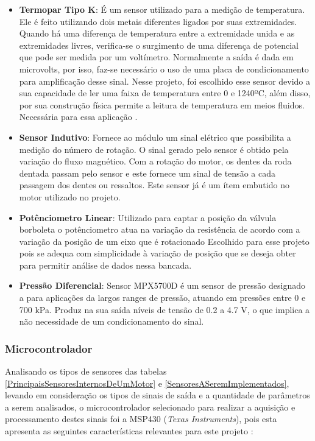 \begin{itemize}	
	\item \textbf{Termopar Tipo K}: É um sensor utilizado para a medição de temperatura. Ele é feito utilizando dois metais diferentes ligados por suas extremidades. Quando há uma diferença de temperatura entre a extremidade unida e as extremidades livres, verifica-se o surgimento de uma diferença de potencial que pode ser medida por um voltímetro. Normalmente a saída é dada em microvolts, por isso, faz-se necessário o uso de uma placa de condicionamento para amplificação desse sinal. Nesse projeto, foi escolhido esse sensor devido a sua capacidade de ler uma faixa de temperatura entre 0 e 1240$º$C, além disso, por sua construção física permite a leitura de temperatura em meios fluidos. Necessária para essa aplicação \cite{vdo01}.
	
	\item \textbf{Sensor Indutivo}: Fornece ao módulo um sinal elétrico que possibilita a medição do número de rotação. O sinal gerado pelo sensor é obtido pela variação do fluxo magnético. Com a rotação do motor, os dentes da roda dentada passam pelo sensor e este fornece um sinal de tensão a cada passagem dos dentes ou ressaltos. Este sensor já é um ítem embutido no motor utilizado no projeto\cite{vdo01}.
	
	\item \textbf{Potênciometro Linear}:
	Utilizado para captar a posição da válvula borboleta o potênciometro atua na variação da resistência de acordo com a variação da posição de um eixo que é rotacionado Escolhido para esse projeto pois se adequa com simplicidade à variação de posição que se deseja obter para permitir análise de dados nessa bancada\cite{vdo01}.
	
	\item \textbf{Pressão Diferencial}: 
	Sensor MPX5700D é um sensor de pressão designado a para aplicações da largos ranges de pressão, atuando em pressões entre 0 e 700 kPa. Produz na sua saída níveis de tensão de 0.2 a 4.7 V, o que implica a não necessidade de um condicionamento do sinal.
\end{itemize}

\subsubsection{Microcontrolador}

Analisando os tipos de sensores das tabelas \ref{PrincipaisSensoresInternosDeUmMotor} e \ref{SensoresASeremImplementados}, levando em consideração os tipos de sinais de saída e a quantidade de parâmetros a serem analisados, o microcontrolador selecionado para realizar a aquisição e processamento destes sinais foi a MSP430 (\textit{Texas Instruments}), pois esta apresenta as seguintes características relevantes para este projeto \cite{texas01}:

